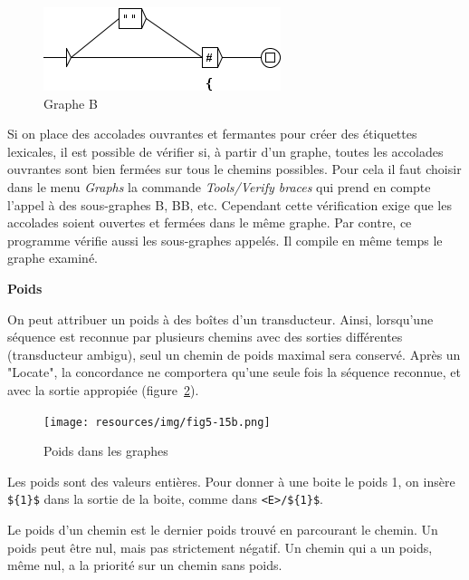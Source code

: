\begin{figure}[!ht]
\begin{center}
\includegraphics[width=262px]{resources/img/B.png}
\caption{Graphe B\label{fig-graphe-B}}
\end{center}
\end{figure}

Si on place des accolades ouvrantes et fermantes pour créer des étiquettes lexicales, il est possible de vérifier si, à partir d'un graphe, toutes les accolades ouvrantes sont bien fermées sur tous le chemins possibles. Pour cela il faut choisir dans le menu \textit{Graphs} la commande \textit{Tools/Verify braces} qui prend en compte l'appel à des sous-graphes B, BB, etc. Cependant cette vérification exige que les accolades soient ouvertes et fermées dans le même graphe. Par contre, ce programme vérifie aussi les sous-graphes appelés. Il compile en même temps le graphe examiné.


\bigskip
\noindent \textbf{Poids}

\noindent On peut attribuer un poids à des boîtes d'un transducteur. Ainsi, lorsqu'une séquence est
reconnue par plusieurs chemins avec des sorties différentes
(transducteur ambigu),
seul un chemin de poids maximal sera conservé.
Après un "Locate", la concordance ne comportera qu'une seule fois la séquence reconnue, et avec la
sortie appropiée (figure~\ref{fig-weights-in-graphs}).

\begin{figure}[!ht]
\begin{center}
\texttt{[image: resources/img/fig5-15b.png]}
\caption{Poids dans les graphes \label{fig-weights-in-graphs}}
\end{center}
\end{figure}

\bigskip
\noindent Les poids sont des valeurs entières. Pour donner à une boite
le poids 1, on insère \verb+${1}$+ dans la sortie de la boite, comme dans \verb+<E>/${1}$+.

\bigskip
\noindent Le poids d'un chemin est le dernier poids trouvé en parcourant le chemin.
Un poids peut être nul, mais pas strictement négatif. Un chemin qui a un poids, même nul, a la priorité sur un chemin
sans poids.

